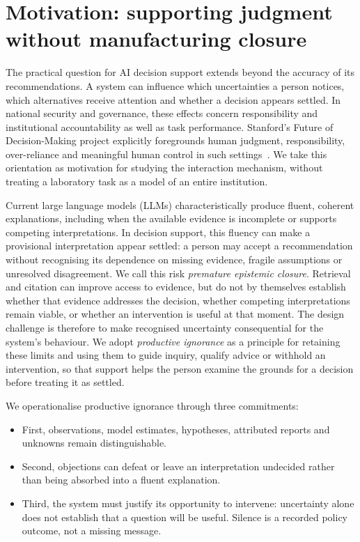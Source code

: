 \documentclass[11pt,a4paper]{article}
\begin{document}
\section{Motivation: supporting judgment without manufacturing closure}
The practical question for AI decision support extends beyond the accuracy of its recommendations. A system can influence which uncertainties a person notices, which alternatives receive attention and whether a decision appears settled. In national security and governance, these effects concern responsibility and institutional accountability as well as task performance. Stanford's Future of Decision-Making project explicitly foregrounds human judgment, responsibility, over-reliance and meaningful human control in such settings~\cite{stanford}. We take this orientation as motivation for studying the interaction mechanism, without treating a laboratory task as a model of an entire institution.

Current large language models (LLMs) characteristically produce fluent, coherent explanations, including when the available evidence is incomplete or supports competing interpretations. In decision support, this fluency can make a provisional interpretation appear settled: a person may accept a recommendation without recognising its dependence on missing evidence, fragile assumptions or unresolved disagreement. We call this risk \emph{premature epistemic closure}. Retrieval and citation can improve access to evidence, but do not by themselves establish whether that evidence addresses the decision, whether competing interpretations remain viable, or whether an intervention is useful at that moment. The design challenge is therefore to make recognised uncertainty consequential for the system's behaviour. We adopt \emph{productive ignorance} as a principle for retaining these limits and using them to guide inquiry, qualify advice or withhold an intervention, so that support helps the person examine the grounds for a decision before treating it as settled.

We operationalise productive ignorance through three commitments:
\begin{itemize} 
  \item First, observations, model estimates, hypotheses, attributed reports and unknowns remain distinguishable. 
  \item Second, objections can defeat or leave an interpretation undecided rather than being absorbed into a fluent explanation. 
  \item Third, the system must justify its opportunity to intervene: uncertainty alone does not establish that a question will be useful. Silence is a recorded policy outcome, not a missing message.
\end{itemize}
\end{document}
